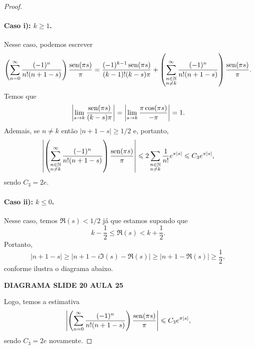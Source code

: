 \begin{proof}
        \paragraph{Caso i): $k\geq 1$.} Nesse caso, podemos escrever
        \begin{align*}
            \left(\sum_{n=0}^{\infty} \frac{(-1)^n}{n!(n+1-s)}\right)\frac{\operatorname{sen}(\pi s)}{\pi}
            = \frac{(-1)^{k-1}\operatorname{sen}(\pi s)}{(k-1)!(k-s)\pi} +
            \left(\sum_{\substack{n\in\mathbb{N} \\ n\neq k}}^{\infty} 
            \frac{(-1)^n}{n!(n+1-s)}\right)\frac{\operatorname{sen}(\pi s)}{\pi}.
        \end{align*}
        Temos que
        \[
        \left|\lim_{s\to k} \frac{\operatorname{sen}(\pi s)}{(k-s)\pi}\right| 
        = \left|\lim_{s\to k} \frac{\pi\cos(\pi s)}{-\pi}\right|
        = 1.
        \]
        Ademais, se $n\neq k$ então $|n+1-s| \geq 1/2$ e, portanto,
        \begin{align*}
            \left|\left(\sum_{\substack{n\in\mathbb{N} \\ n\neq k}}^{\infty} 
            \frac{(-1)^n}{n!(n+1-s)}\right)\frac{\operatorname{sen}(\pi s)}{\pi}\right|
            \leqslant 2\sum_{\substack{n\in\mathbb{N} \\ n\neq k}} \frac{1}{n!}e^{\pi |s|}
            \leqslant C_3e^{\pi |s|},
        \end{align*}
        sendo $C_3 = 2e$.
        \paragraph{Caso ii): $k\leq 0$.} Nesse caso, temos $\Re(s) < 1/2$ já que estamos
        supondo que 
        \[
        k - \frac{1}{2} \leq \Re(s) < k + \frac{1}{2}.
        \]
        Portanto,
        \[
        |n+1-s| \geq |n+1 - i\Im(s) - \Re(s)| \geq |n+1 - \Re(s)| \geq \frac{1}{2},
        \]
        conforme ilustra o diagrama abaixo. 
        \begin{center}
            {\bf DIAGRAMA SLIDE 20 AULA 25}
        \end{center}
        Logo, temos a estimativa
        \[
        \left|\left(\sum_{n=0}^{\infty} \frac{(-1)^n}{n!(n+1-s)}\right)\frac{\operatorname{sen}(\pi s)}{\pi}\right|
        \leqslant C_3e^{\pi |s|},
        \]
        sendo $C_3 = 2e$ novamente.
        

\end{proof}
